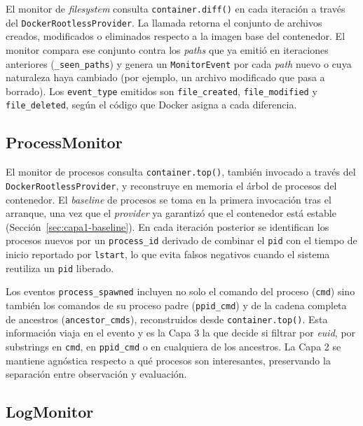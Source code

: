 El monitor de \textit{filesystem} consulta \texttt{container.diff()} en cada
iteración a través del \texttt{DockerRootlessProvider}. La llamada retorna el
conjunto de archivos creados, modificados o eliminados respecto a la imagen base
del contenedor. El monitor compara ese conjunto contra los \textit{paths} que ya
emitió en iteraciones anteriores (\texttt{\_seen\_paths}) y genera un
\texttt{MonitorEvent} por cada \textit{path} nuevo o cuya naturaleza haya
cambiado (por ejemplo, un archivo modificado que pasa a borrado). Los
\texttt{event\_type} emitidos son \texttt{file\_created},
\texttt{file\_modified} y \texttt{file\_deleted}, según el código que Docker
asigna a cada diferencia.

\subsection{ProcessMonitor}

\begin{sloppypar}
El monitor de procesos consulta \texttt{container.top()}, también invocado a
través del \texttt{DockerRootlessProvider}, y reconstruye en memoria el árbol de
procesos del contenedor. El \textit{baseline} de procesos se toma en la primera
invocación tras el arranque, una vez que el \textit{provider} ya garantizó que
el contenedor está estable (Sección~\ref{sec:capa1-baseline}). En cada iteración
posterior se identifican los procesos nuevos por un \texttt{process\_id}
derivado de combinar el \texttt{pid} con el tiempo de inicio reportado por
\texttt{lstart}, lo que evita falsos negativos cuando el sistema reutiliza un
\texttt{pid} liberado.
\end{sloppypar}

Los eventos \texttt{process\_spawned} incluyen no solo el comando del proceso
(\texttt{cmd}) sino también los comandos de su proceso padre
(\texttt{ppid\_cmd}) y de la cadena completa de ancestros
(\texttt{ancestor\_cmds}), reconstruidos desde \texttt{container.top()}. Esta
información viaja en el evento y es la Capa 3 la que decide si filtrar por
\textit{euid}, por substrings en \texttt{cmd}, en \texttt{ppid\_cmd} o en
cualquiera de los ancestros. La Capa 2 se mantiene agnóstica respecto a qué
procesos son interesantes, preservando la separación entre observación y
evaluación.

\subsection{LogMonitor}

